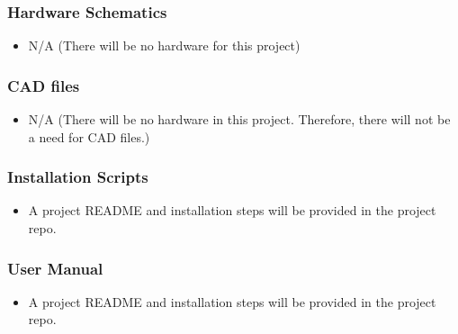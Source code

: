 \subsubsection{Hardware Schematics}
\begin{itemize}
  \item N/A (There will be no hardware for this project)
\end{itemize}

\subsubsection{CAD files}
\begin{itemize}
  \item N/A (There will be no hardware in this project. Therefore, there will not be a need for CAD files.)
\end{itemize}

\subsubsection{Installation Scripts}
\begin{itemize}
  \item A project README and installation steps will be provided in the project repo.
\end{itemize}

\subsubsection{User Manual}
\begin{itemize}
  \item A project README and installation steps will be provided in the project repo.
\end{itemize}
